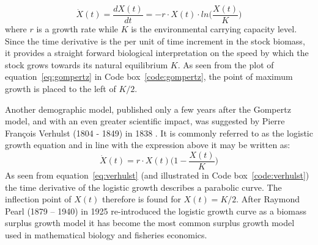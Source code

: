 \documentclass[11pt,fleqn]{book} %
\begin{document}
\begin{equation} 
\label{eq:gompertz}
\dot{X}(t) = \frac{dX(t)}{dt} = - r \cdot X(t) \cdot ln\Big(\frac{X(t)}{K}\Big)
\end{equation}
where $r$ is a growth rate while $K$ is the environmental carrying capacity level. Since the time derivative is the per unit of time increment in the stock biomass, it provides a straight forward biological interpretation on the speed by which the stock grows towards its natural equilibrium $K$. As seen from the plot of equation~\ref{eq:gompertz} in Code box~\ref{code:gompertz}, the point of maximum growth is placed to the left of $K/2$.

Another demographic model, published only a few years after the Gompertz model, and with an even greater scientific impact, was suggested by Pierre François Verhulst (1804 - 1849) in 1838 \cite{Verhulst1838}. It is commonly referred to as the logistic growth equation and in line with the expression above it may be written as:
\begin{equation} 
\label{eq:verhulst}
\dot{X}(t) = r \cdot X(t) \Big(1 - \frac{X(t)}{K}\Big)
\end{equation}
As seen from equation~\ref{eq:verhulst} (and illustrated in Code box~\ref{code:verhulst}) the time derivative of the logistic growth describes a parabolic curve. The inflection point of $X(t)$ therefore is found for $X(t) = K/2$. After Raymond Pearl (1879 -- 1940) in 1925 re-introduced the logistic growth curve as a biomass surplus growth model\cite{Pearl1925} it has become the most common surplus growth model used in mathematical biology and fisheries economics.
\end{document}
